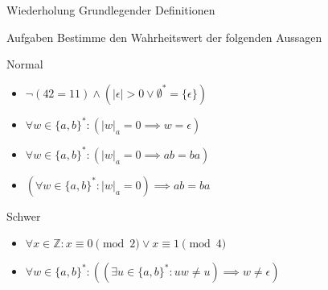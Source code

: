 {
\begin{frame}[fragile]{Wiederholung Grundlegender Definitionen}
    \begin{alertblock}{Aufgaben}
        Bestimme den Wahrheitswert der folgenden Aussagen
    \end{alertblock}
    \begin{block}{Normal}
        \begin{itemize}
            \item $\neg (42 = 11) \wedge (|\epsilon| > 0 \vee \emptyset^* = \{\epsilon\})$
            \item $\forall w \in \{a, b\}^*: (|w|_a = 0 \implies w = \epsilon)$
            \item $\forall w \in \{a, b\}^*: (|w|_a = 0 \implies ab = ba)$
            \item $(\forall w \in \{a, b\}^*: |w|_a = 0) \implies ab = ba$
        \end{itemize}
    \end{block}
    \begin{block}{Schwer}
        \begin{itemize}
            \item $\forall x \in \mathbb{Z}: x \equiv 0 \pmod{2} \vee x \equiv 1 \pmod{4}$
            \item $\forall w \in \{a, b\}^*: \left(\left(\exists u \in \{a,b\}^*: uw \neq u\right) \implies w \neq \epsilon\right)$
        \end{itemize}
    \end{block}
\end{frame}
}

